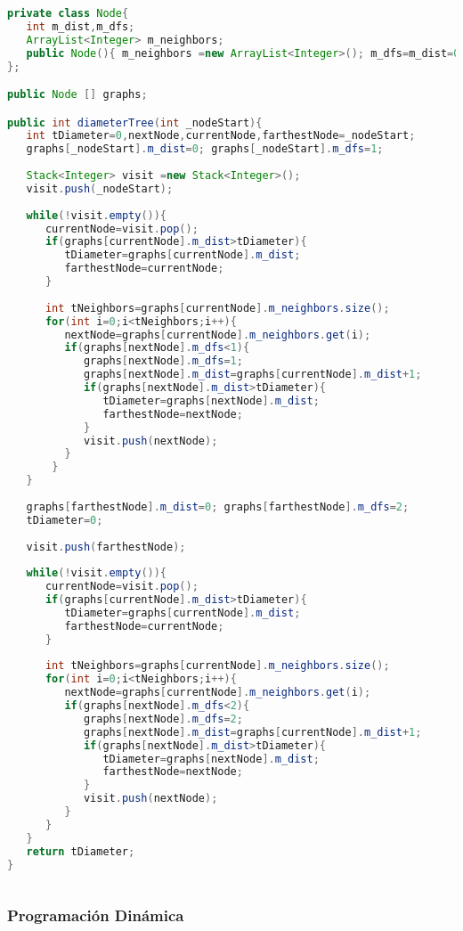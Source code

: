 \begin{lstlisting}[language=Java]
private class Node{
   int m_dist,m_dfs;
   ArrayList<Integer> m_neighbors;
   public Node(){ m_neighbors =new ArrayList<Integer>(); m_dfs=m_dist=0;}
};

public Node [] graphs;

public int diameterTree(int _nodeStart){
   int tDiameter=0,nextNode,currentNode,farthestNode=_nodeStart;
   graphs[_nodeStart].m_dist=0; graphs[_nodeStart].m_dfs=1;
	
   Stack<Integer> visit =new Stack<Integer>();
   visit.push(_nodeStart);
	
   while(!visit.empty()){
      currentNode=visit.pop();
      if(graphs[currentNode].m_dist>tDiameter){
         tDiameter=graphs[currentNode].m_dist;
         farthestNode=currentNode;
      }
		
      int tNeighbors=graphs[currentNode].m_neighbors.size();
      for(int i=0;i<tNeighbors;i++){
         nextNode=graphs[currentNode].m_neighbors.get(i);
         if(graphs[nextNode].m_dfs<1){
            graphs[nextNode].m_dfs=1;
            graphs[nextNode].m_dist=graphs[currentNode].m_dist+1;
            if(graphs[nextNode].m_dist>tDiameter){
               tDiameter=graphs[nextNode].m_dist;
               farthestNode=nextNode;
            }
			visit.push(nextNode);
         }
       }
   }
	
   graphs[farthestNode].m_dist=0; graphs[farthestNode].m_dfs=2;
   tDiameter=0;
	
   visit.push(farthestNode);
	
   while(!visit.empty()){
      currentNode=visit.pop();
      if(graphs[currentNode].m_dist>tDiameter){
         tDiameter=graphs[currentNode].m_dist;
         farthestNode=currentNode;
      }
		
      int tNeighbors=graphs[currentNode].m_neighbors.size();
      for(int i=0;i<tNeighbors;i++){
         nextNode=graphs[currentNode].m_neighbors.get(i);
         if(graphs[nextNode].m_dfs<2){
            graphs[nextNode].m_dfs=2;
            graphs[nextNode].m_dist=graphs[currentNode].m_dist+1;
            if(graphs[nextNode].m_dist>tDiameter){
               tDiameter=graphs[nextNode].m_dist;
               farthestNode=nextNode;
            }
			visit.push(nextNode);
         }
      }
   }
   return tDiameter;
}
	
\end{lstlisting}

\subsubsection{Programación Dinámica}

